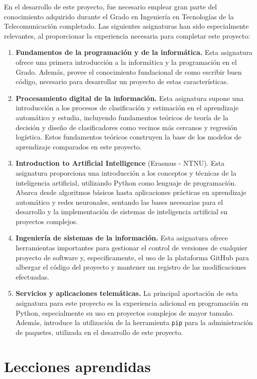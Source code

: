 En el desarrollo de este proyecto, fue necesario emplear gran parte del conocimiento adquirido durante el Grado en Ingeniería en Tecnologías de la Telecomunicación completado. Las siguientes asignaturas han sido especialmente relevantes, al proporcionar la experiencia necesaria para completar este proyecto:
\begin{enumerate}
    \item \textbf{Fundamentos de la programación y de la informática.} Esta asignatura ofrece una primera introducción a la informática y la programación en el Grado. Además, provee el conocimiento fundacional de como escribir buen código, necesario para desarrollar un proyecto de estas características.
    \item \textbf{Procesamiento digital de la información.} Esta asignatura supone una introducción a los procesos de clasificación y estimación en el aprendizaje automático y estudia, incluyendo fundamentos teóricos de teoría de la decisión y diseño de clasificadores como vecinos más cercanos y regresión logística. Estos fundamentos teóricos construyen la base de los modelos de aprendizaje comparados en este proyecto.
    \item \textbf{Introduction to Artificial Intelligence} (Erasmus - NTNU). Esta asignatura proporciona una introducción a los conceptos y técnicas de la inteligencia artificial, utilizando Python como lenguaje de programación. Abarca desde algoritmos básicos hasta aplicaciones prácticas en aprendizaje automático y redes neuronales, sentando las bases necesarias para el desarrollo y la implementación de sistemas de inteligencia artificial en proyectos complejos.
    \item \textbf{Ingeniería de sistemas de la información.} Esta asignatura ofrece herramientas importantes para gestionar el control de versiones de cualquier proyecto de software y, especificamente, el uso de la plataforma GitHub para albergar el código del proyecto y mantener un registro de las modificaciones efectuadas.
    \item \textbf{Servicios y aplicaciones telemáticas.} La principal aportación de esta asignatura para este proyecto es la experiencia adicional en programación en Python, especialmente su uso en proyectos complejos de mayor tamaño. Además, introduce la utilización de la herramienta \texttt{pip} para la administración de paquetes, utilizada en el desarrollo de este proyecto.
\end{enumerate}

\section{Lecciones aprendidas}
\label{sec:lecciones_aprendidas}

